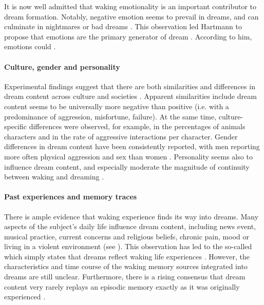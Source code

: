 It is now well admitted that waking emotionality is an important contributor to dream formation. Notably, negative emotion seems to prevail in dreams, and can culminate in nightmares or bad dreams \citep{zadra_nightmares_2000, zadra_variety_2006}. This observation led Hartmann to propose that emotions are the primary generator of dream \citep{hartmann_nature_2007, hartmann_central_2008}. According to him, emotions could  \citep{de_koninck_sleep_2012}.

\paragraph{Culture, gender and personality}

Experimental findings suggest that there are both similarities and differences in dream content across culture and societies \citep{domhoff_similarities_2008}. Apparent similarities include dream content seems to be universally more negative than positive (i.e. with a predominance of aggression, misfortune, failure). At the same time, culture-specific differences were observed, for example, in the percentages of animals characters and in the rate of aggressive interactions per character. Gender differences in dream content have been consistently reported, with men reporting more often physical aggression and sex than women \citep{nielsen_typical_2003, schredl_typical_2004}. Personality seems also to influence dream content, and especially moderate the magnitude of continuity between waking and dreaming \citep{schredl_dreaming_1996, schredl_characteristics_2010}.

\paragraph{Past experiences and memory traces}

There is ample evidence that waking experience finds its way into dreams. Many aspects of the subject’s daily life influence dream content, including news event, musical practice, current concerns and religious beliefs, chronic pain, mood or living in a violent environment (see \citealp{ruby_experimental_2011}). This observation has led to the so-called  which simply states that dreams reflect waking life experiences \citep{schredl_continuity_2003}. However, the characteristics and time course of the waking memory sources integrated into dreams are still unclear. Furthermore, there is a rising consensus that dream content very rarely replays an episodic memory exactly as it was originally experienced \citep{fosse_dreaming_2003, nielsen_what_2005}.

